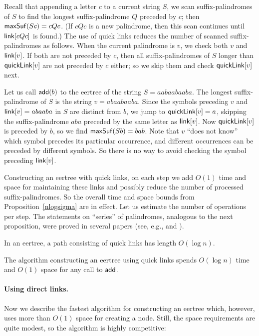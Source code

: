 \documentclass{llncs}
\def\add{{\sf add}}
\def\maxsuf{{\sf maxSuf}}
\def\link{{\sf link}}
\def\quick{{\sf quickLink}}
\begin{document}
Recall that appending a letter $c$ to a current string $S$, we scan suffix-palindromes of $S$ to find the longest suffix-palindrome $Q$ preceded by $c$; then $\maxsuf(Sc)=cQc$. (If $cQc$ is a new palindrome, then this scan continues until $\link[cQc]$ is found.) The use of quick links reduces the number of scanned suffix-palindromes as follows. When the current palindrome is $v$, we check both $v$ and $\link[v]$. If both are not preceded by $c$, then all suffix-palindromes of $S$ longer than $\quick[v]$ are not preceded by $c$ either; so we skip them and check $\quick[v]$ next.

\begin{example} \label{ex:quick}
Let us call $\add(b)$ to the eertree of the string $S=aabaabaaba$. The longest suffix-palindrome of $S$ is the string $v=abaabaaba$. Since the symbols preceding $v$ and $\link[v]=abaaba$ in $S$ are distinct from $b$, we jump to $\quick[v]=a$, skipping the suffix-palindrome $aba$ preceded by the same letter as $\link[v]$. Now $\quick[v]$ is preceded by $b$, so we find $\maxsuf(Sb)=bab$. Note that $v$ ``does not know'' which symbol precedes its particular occurrence, and different occurrences can be preceded by different symbols. So there is no way to avoid checking the symbol preceding $\link[v]$.
\end{example}

Constructing an eertree with quick links, on each step we add $O(1)$ time and space for maintaining these links and possibly reduce the number of processed suffix-palindromes. So the overall time and space bounds from Proposition~\ref{nlogsigma} are in effect. Let us estimate the number of operations per step. The statements on ``series'' of palindromes, analogous to the next proposition, were proved in several papers (see, e.g., \cite[Lemmas 5,6]{KRS15} and \cite[Lemma 5]{FGKK14}).

\begin{proposition}\label{quicklog}
In an eertree, a path consisting of quick links has length $O(\log n)$.
\end{proposition}

\begin{corollary}
The algorithm constructing an eertree using quick links spends $O(\log n)$ time and $O(1)$ space for any call to $\add$.
\end{corollary}


\paragraph*{Using direct links.}
Now we describe the fastest algorithm for constructing an eertree which, however, uses more than $O(1)$ space for creating a node. Still, the space requirements are quite modest, so the algorithm is highly competitive:
\end{document}
